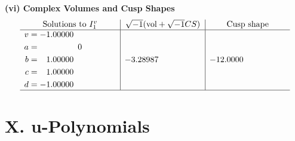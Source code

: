 \documentclass[1p]{elsarticle_modified}
\theoremstyle{definition}
\newcommand{\I}{\sqrt{-1}}
\begin{document}
\newpage\flushleft \textbf{(vi) Complex Volumes and Cusp Shapes}
$$\begin{array}{c|c|c}  
\text{Solutions to }I^v_{1}& \I (\text{vol} + \sqrt{-1}CS) & \text{Cusp shape}\\
 \hline 
\begin{aligned}
v &= -1.00000\phantom{ +0.000000I} \\
a &= \phantom{-0.000000 } 0 \\
b &= \phantom{-}1.00000\phantom{ +0.000000I} \\
c &= \phantom{-}1.00000\phantom{ +0.000000I} \\
d &= -1.00000\phantom{ +0.000000I}\end{aligned}
 & -3.28987\phantom{ +0.000000I} & -12.0000\phantom{ +0.000000I}\\
 \hline 
 \end{array}$$\newpage
\newpage\renewcommand{\arraystretch}{1}
\centering \section*{ X. u-Polynomials}
\end{document}
